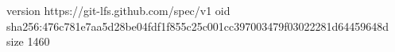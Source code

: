 version https://git-lfs.github.com/spec/v1
oid sha256:476c781e7aa5d28be04fdf1f855c25c001cc397003479f03022281d64459648d
size 1460
